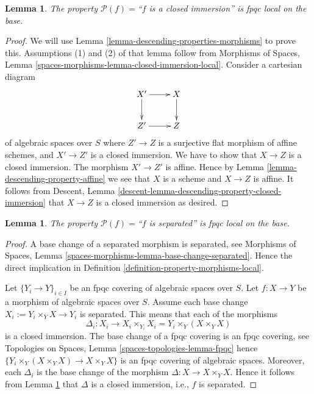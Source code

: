 \documentclass{stacks-project}
\theoremstyle{plain}
\newtheorem{lemma}[subsection]{Lemma}
\theoremstyle{definition}
\theoremstyle{remark}
\numberwithin{equation}{subsection}
\begin{document}
\begin{lemma}
\label{lemma-descending-property-closed-immersion}
The property $\mathcal{P}(f) =$``$f$ is a closed immersion''
is fpqc local on the base.
\end{lemma}

\begin{proof}
We will use
Lemma \ref{lemma-descending-properties-morphisms}
to prove this. Assumptions (1) and (2) of that lemma follow from
Morphisms of Spaces,
Lemma \ref{spaces-morphisms-lemma-closed-immersion-local}.
Consider a cartesian diagram
$$
\xymatrix{
X' \ar[r] \ar[d] & X \ar[d] \\
Z' \ar[r] & Z
}
$$
of algebraic spaces over $S$
where $Z' \to Z$ is a surjective flat morphism of affine schemes,
and $X' \to Z'$ is a closed immersion. We have to show that $X \to Z$
is a closed immersion. The morphism $X' \to Z'$ is affine. Hence by
Lemma \ref{lemma-descending-property-affine}
we see that $X$ is a scheme and $X \to Z$ is affine.
It follows from
Descent, Lemma \ref{descent-lemma-descending-property-closed-immersion}
that $X \to Z$ is a closed immersion as desired.
\end{proof}

\begin{lemma}
\label{lemma-descending-property-separated}
The property $\mathcal{P}(f) =$``$f$ is separated''
is fpqc local on the base.
\end{lemma}

\begin{proof}
A base change of a separated morphism is separated, see
Morphisms of Spaces,
Lemma \ref{spaces-morphisms-lemma-base-change-separated}.
Hence the direct implication in
Definition \ref{definition-property-morphisms-local}.

\medskip\noindent
Let $\{Y_i \to Y\}_{i \in I}$ be an fpqc covering of algebraic spaces over $S$.
Let $f : X \to Y$ be a morphism of algebraic spaces over $S$.
Assume each base change $X_i := Y_i \times_Y X \to Y_i$ is separated.
This means that each of the morphisms
$$
\Delta_i :
X_i
\longrightarrow
X_i \times_{Y_i} X_i = Y_i \times_Y (X \times_Y X)
$$
is a closed immersion. The base change of a fpqc covering is an
fpqc covering, see
Topologies on Spaces, Lemma \ref{spaces-topologies-lemma-fpqc}
hence $\{Y_i \times_Y (X \times_Y X) \to X \times_Y X\}$
is an fpqc covering of algebraic spaces. Moreover, each
$\Delta_i$ is the base change of the morphism
$\Delta : X \to X \times_Y X$. Hence it follows from
Lemma \ref{lemma-descending-property-closed-immersion}
that $\Delta$ is a closed immersion, i.e., $f$ is separated.
\end{proof}
\end{document}
